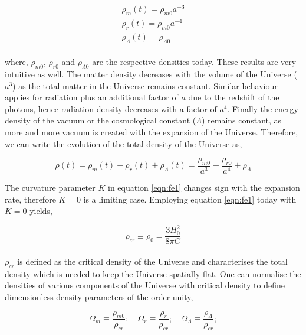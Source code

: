 \begin{equation}
\begin{array}{l}
\rho_m(t) = \rho_{m0} a^{-3} \\
\rho_r(t) = \rho_{m0} a^{-4} \\
\rho_{\Lambda}(t) = \rho_{\Lambda 0}

\end{array} 
\label{eq:xdef}
\end{equation}
\\ 
where, $\rho_{m0}$, $\rho_{r0}$ and $\rho_{\Lambda 0}$ are the respective densities
today. These results are very intuitive as well. The matter density decreases with the volume 
of the Universe ($a^3$) as the total matter in the Universe remains constant. Similar
behaviour applies for radiation plus an additional factor of $a$ due to the redshift
of the photons, hence radiation density decreases with a factor of $a^4$. Finally the
energy density of the vacuum or the cosmological constant ($\Lambda$) remains constant, 
as more and more vacuum is created with the expansion of the Universe. Therefore,
we can write the evolution of the total density of the Universe as,

\begin{equation}
	\rho(t) = \rho_m(t)+\rho_r(t)+\rho_{\Lambda}(t) = \dfrac{\rho_{m0}}{a^3} + 
				\dfrac{\rho_{r0}}{a^4} + \rho_{\Lambda}
	\label{eqn:dens}
\end{equation}



The curvature parameter $K$ in equation \ref{eqn:fe1} changes sign with the expansion 
rate, therefore $K=0$ is a limiting case. Employing equation \ref{eqn:fe1} today with
$K=0$ yields,

\begin{equation}
	\rho_{cr} \equiv \rho_0 = \dfrac{3H_0^2}{8\pi G}
\end{equation}
\\
$\rho_{cr}$ is defined as the critical density of the Universe and characterises the total density
which is needed to keep the Universe spatially flat. One can normalise the densities of
various components of the Universe with critical density to define dimensionless density
parameters of the order unity,

\begin{equation}
	\Omega_m \equiv \dfrac{\rho_{m0}}{\rho_{cr}};\quad
	\Omega_r \equiv \dfrac{\rho_{r}}{\rho_{cr}};\quad
	\Omega_{\Lambda} \equiv \dfrac{\rho_{\Lambda}}{\rho_{cr}};
	\label{eqn:Omega}
\end{equation}

